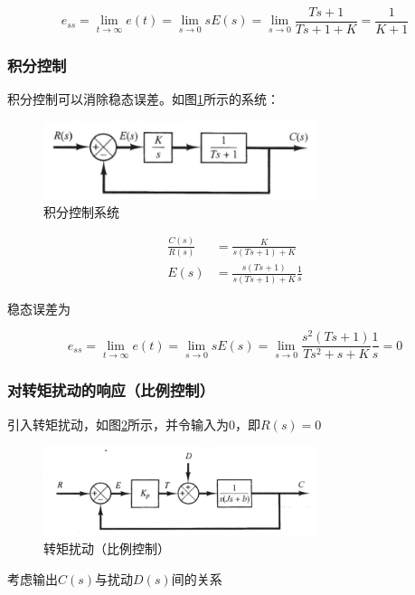 \begin{equation*}
e_{ss}=\lim_{t\to\infty}e(t)=\lim_{s\to0}sE(s)=\lim_{s\to0}\frac{Ts+1}{Ts+1+K}=\frac{1}{K+1}
\end{equation*}

\subsubsection{积分控制}

积分控制可以消除稳态误差。如图\ref{14}所示的系统：

\begin{figure}[!ht]
	\centering
	\includegraphics[width=8cm]{figures/14.png}
	\caption{积分控制系统}
	\label{14}
\end{figure}

\begin{align*}
\frac{C(s)}{R(s)}&=\frac{K}{s(Ts+1)+K}\\
{E(s)}&=\frac{s(Ts+1)}{s(Ts+1)+K}\frac1s
\end{align*}

稳态误差为

\begin{equation*}
e_{ss}=\lim_{t\to\infty}e(t)=\lim_{s\to0}sE(s)=\lim_{s\to0}\frac{s^2(Ts+1)}{Ts^2+s+K}\frac1s=0
\end{equation*}

\subsubsection{对转矩扰动的响应（比例控制）}

引入转矩扰动，如图\ref{15}所示，并令输入为$0$，即$R(s)=0$

\begin{figure}[!ht]
	\centering
	\includegraphics[width=8cm]{figures/15.png}
	\caption{转矩扰动（比例控制）}
	\label{15}
\end{figure}

考虑输出$C(s)$与扰动$D(s)$间的关系

